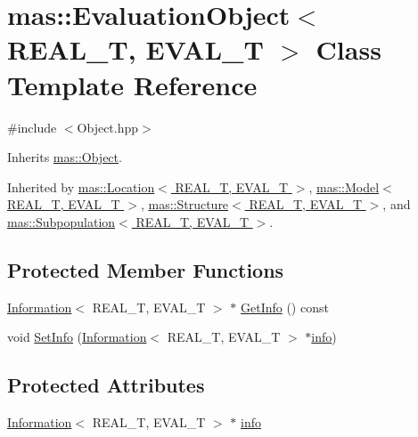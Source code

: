 \hypertarget{classmas_1_1_evaluation_object}{}\section{mas\+:\+:Evaluation\+Object$<$ R\+E\+A\+L\+\_\+\+T, E\+V\+A\+L\+\_\+\+T $>$ Class Template Reference}
\label{classmas_1_1_evaluation_object}


{\ttfamily \#include $<$Object.\+hpp$>$}



Inherits \hyperlink{classmas_1_1_object}{mas\+::\+Object}.



Inherited by \hyperlink{classmas_1_1_location}{mas\+::\+Location$<$ R\+E\+A\+L\+\_\+\+T, E\+V\+A\+L\+\_\+\+T $>$}, \hyperlink{classmas_1_1_model}{mas\+::\+Model$<$ R\+E\+A\+L\+\_\+\+T, E\+V\+A\+L\+\_\+\+T $>$}, \hyperlink{classmas_1_1_structure}{mas\+::\+Structure$<$ R\+E\+A\+L\+\_\+\+T, E\+V\+A\+L\+\_\+\+T $>$}, and \hyperlink{classmas_1_1_subpopulation}{mas\+::\+Subpopulation$<$ R\+E\+A\+L\+\_\+\+T, E\+V\+A\+L\+\_\+\+T $>$}.

\subsection*{Protected Member Functions}
\begin{DoxyCompactItemize}
\item 
\hyperlink{classmas_1_1_information}{Information}$<$ R\+E\+A\+L\+\_\+\+T, E\+V\+A\+L\+\_\+\+T $>$ $\ast$ \hyperlink{classmas_1_1_evaluation_object_af50a7cf1f746956e996acbd7dec5f43b}{Get\+Info} () const 
\item 
void \hyperlink{classmas_1_1_evaluation_object_a4da11c844c820787d892cc83b50d9b88}{Set\+Info} (\hyperlink{classmas_1_1_information}{Information}$<$ R\+E\+A\+L\+\_\+\+T, E\+V\+A\+L\+\_\+\+T $>$ $\ast$\hyperlink{classmas_1_1_evaluation_object_a5029ee28e34a1496c3c46dc82c5d8b8d}{info})
\end{DoxyCompactItemize}
\subsection*{Protected Attributes}
\begin{DoxyCompactItemize}
\item 
\hyperlink{classmas_1_1_information}{Information}$<$ R\+E\+A\+L\+\_\+\+T, E\+V\+A\+L\+\_\+\+T $>$ $\ast$ \hyperlink{classmas_1_1_evaluation_object_a5029ee28e34a1496c3c46dc82c5d8b8d}{info}
\end{DoxyCompactItemize}
